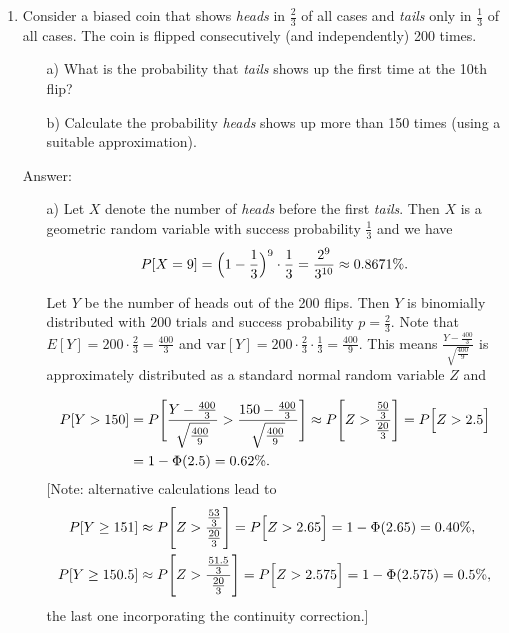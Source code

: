 \documentclass{article}
\begin{document}
\begin{enumerate}
\begin{itemize}
\end{itemize}


\newpage
\item
Consider a biased coin that shows {\em heads} in $\frac{2}{3}$ of all cases and {\em tails} only in $\frac{1}{3}$ of all cases. The coin is flipped consecutively (and independently) 200 times. 
\begin{itemize}
	\item[a)] What is the probability that {\em tails} shows up the first time at the 10th flip?
	\item[b)] Calculate the probability  {\em heads}  shows up more than 150 times (using a suitable approximation). 

\end{itemize}


Answer:

\begin{itemize}


\item[a)] Let $X$ denote the number of {\em heads} before the first {\em tails}. Then $X$ is a geometric random variable with success probability $\frac{1}{3}$ and we have
		\[ P[X=9] = \Bigl(1 - \frac{1}{3}\Bigr)^9 \cdot \frac{1}{3} = \frac{2^9}{3^{10}} \approx 0.8671\%.
		\]
		
		
		Let $Y$ be the number of heads out of the 200 flips. Then $Y$ is binomially distributed with $200$ trials and success probability $p = \frac{2}{3}$. Note that $E[Y] = 200 \cdot \frac{2}{3} = \frac{400}{3}$ and $\text{var}[Y] = 200 \cdot \frac{2}{3} \cdot \frac{1}{3} = \frac{400}{9}$. This means $\frac{Y - \frac{400}{3}}{\sqrt{\frac{400}{9}}}$ is approximately distributed as a standard normal random variable $Z$ and 

		\begin{align*}
		P[Y> 150] & = P\Biggl[ \frac{Y - \frac{400}{3}}{\sqrt{\frac{400}{9}}} > \frac{150 - \frac{400}{3}}{\sqrt{\frac{400}{9}}}\Biggr] \approx P\Biggl[ Z >\frac{\frac{50}{3}}{\frac{20}{3}} \Biggr] = P\Bigl[ Z > 2.5 \Bigr]\\& = 1- \Phi(2.5) = 0.62\%.
		\end{align*}
		[Note: alternative calculations lead to
		\begin{align*}
		P[Y \geq 151] &  \approx P\Biggl[ Z >\frac{\frac{53}{3}}{\frac{20}{3}} \Biggr] = P\Bigl[ Z > 2.65 \Bigr] = 1- \Phi(2.65) = 0.40\%,\\
		P[Y \geq 150.5] &  \approx P\Biggl[ Z >\frac{\frac{51.5}{3}}{\frac{20}{3}} \Biggr] = P\Bigl[ Z > 2.575 \Bigr] = 1- \Phi(2.575) = 0.5\%,
		\end{align*}
		the last one incorporating the continuity correction.]


\end{itemize}
\end{enumerate}
\end{document}
